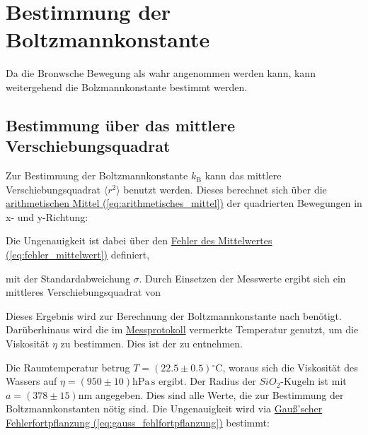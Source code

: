 \section{Bestimmung der Boltzmannkonstante}
\label{sec:A3}
Da die Bronwsche Bewegung als wahr angenommen werden kann, kann weitergehend die Bolzmannkonstante bestimmt werden. 

\subsection{Bestimmung über das mittlere Verschiebungsquadrat}
\label{ssec:A3_1}
Zur Bestimmung der Boltzmannkonstante $k_\text{B}$ kann das mittlere Verschiebungsquadrat $\langle r^2 \rangle$ benutzt werden. Dieses berechnet sich über die \hyperref[eq:arithmetisches_mittel]{arithmetischen Mittel (\ref*{eq:arithmetisches_mittel})} der quadrierten Bewegungen in x- und y-Richtung:


Die Ungenauigkeit ist dabei über den \hyperref[eq:fehler_mittelwert]{Fehler des Mittelwertes (\ref*{eq:fehler_mittelwert})} definiert,


mit der Standardabweichung $\sigma$. Durch Einsetzen der Messwerte ergibt sich ein mittleres Verschiebungsquadrat von


Dieses Ergebnis wird zur Berechnung der Boltzmannkonstante nach  benötigt. Darüberhinaus wird die im \hyperref[ch:Protokoll]{Messprotokoll} vermerkte Temperatur genutzt, um die Viskosität $\eta$ zu bestimmen. 
Dies ist der  zu entnehmen.


Die Raumtemperatur betrug $T = (22.5 \pm 0.5) \mathrm{^\circ C}$, woraus sich die Viskosität des Wassers auf $\eta = (950 \pm 10) \mathrm{hPa \, s}$ ergibt. 
Der Radius der $SiO_2$-Kugeln ist mit $a = (378 \pm 15) \mathrm{nm}$ angegeben. Dies sind alle Werte, die zur Bestimmung der Boltzmannkonstanten nötig sind. Die Ungenauigkeit wird via \hyperref[eq:gauss_fehlfortpflanzung]{Gauß'scher Fehlerfortpflanzung (\ref*{eq:gauss_fehlfortpflanzung})} bestimmt:

